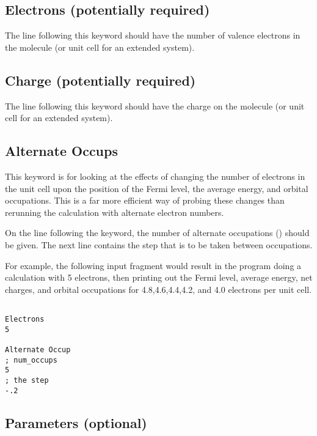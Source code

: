 \subsection{{\sf Electrons} (potentially required)}

The line following this keyword should have the number of valence
electrons in the molecule (or unit cell for an extended system).

\subsection{{\sf Charge} (potentially required)}

The line following this keyword should have the charge on the molecule
(or unit cell for an extended system). \\[0.1in]


\subsection{{\sf Alternate Occups} }

This keyword is for looking at the effects of changing the number of
electrons in the unit cell upon the position of the Fermi level, the
average energy, and orbital occupations.  This is a far more efficient
way of probing these changes than rerunning the calculation with
alternate electron numbers.

On the line following the keyword, the number of alternate occupations
() should be given.  The next line contains the step
that is to be taken between occupations.

For example, the following input fragment would result in the program
doing a calculation with 5 electrons, then printing out the Fermi
level, average energy, net charges, and orbital occupations for
4.8,4.6,4.4,4.2, and 4.0 electrons per unit cell.

\shrinkspacing
\begin{verbatim}

Electrons
5

Alternate Occup
; num_occups
5
; the step
-.2
\end{verbatim}
\resumespacing



\subsection{{\sf Parameters} (optional)}

